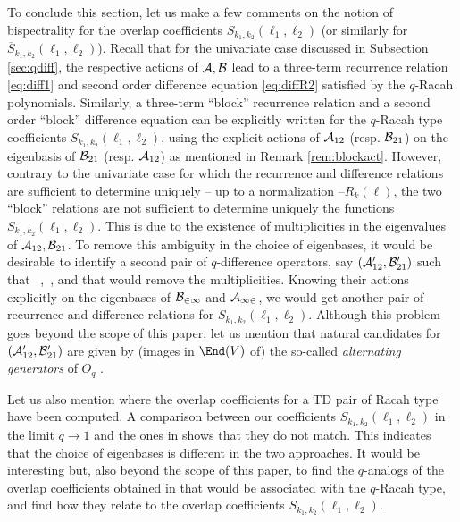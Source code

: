 \documentclass[11pt]{amsart}
\numberwithin{equation}{section}
\numberwithin{equation}{section}
\begin{document}
To conclude this section, let us make a few comments on the
notion of bispectrality for the overlap coefficients ${S}_{k_1,k_2}(\ell_1,\ell_2)$ (or similarly for $\overline{S}_{k_1,k_2}(\ell_1,\ell_2)$).
Recall that for the univariate case discussed in Subsection \ref{sec:qdiff}, the respective actions of ${\cal A},{\cal B}$ lead to a three-term recurrence relation \eqref{eq:diff1} and second order difference equation \eqref{eq:diffR2} satisfied by the $q$-Racah polynomials.
Similarly, a three-term ``block'' recurrence  relation and a second order ``block'' difference equation can be explicitly written 
for the $q$-Racah type coefficients  ${S}_{k_1,k_2}(\ell_1,\ell_2)$, using the explicit actions of ${\cal A}_{12}$ (resp. ${\cal B}_{21}$) on the eigenbasis of ${\cal B}_{21}$ (resp. ${\cal A}_{12}$) as mentioned in Remark \ref{rem:blockact}. However, contrary to the univariate case for which the recurrence and difference relations are sufficient to determine uniquely -- up to a normalization --$R_k(\ell)$, the two ``block'' relations are not sufficient to determine uniquely the functions ${S}_{k_1,k_2}(\ell_1,\ell_2)$. This is due to the existence of multiplicities in the eigenvalues of ${\cal A}_{12},{\cal B}_{21}$. To remove this ambiguity in the choice of eigenbases, it would be desirable to identify a second pair of $q$-difference operators, say $({\cal A}'_{12},{\cal B}'_{21})$
such that 
 \ ,\ ,
\eeqa
and that would remove the multiplicities.  Knowing their actions explicitly on the eigenbases of $\cal B_{21}$ and $\cal A_{12}$, 
we would get another pair of recurrence and difference relations for  ${S}_{k_1,k_2}(\ell_1,\ell_2)$. Although this problem goes beyond the scope of this paper, let us mention that
natural candidates for $({\cal A}'_{12},{\cal B}'_{21})$ are given by (images in $\End(V)$ of) the so-called {\it alternating generators} of $O_q$ \cite{BasBel,Ter21b}.  
   
Let us also mention \cite{CGT25} where the overlap coefficients for a TD pair of Racah type have been computed. A comparison between our coefficients ${S}_{k_1,k_2}(\ell_1,\ell_2)$ in the limit $q\rightarrow 1$ and the ones in \cite[Thm.\,5.1]{CGT25} shows that they do not match.   This indicates that the choice of eigenbases is different in the two approaches. It would be interesting but, also beyond the scope of this paper, to find the $q$-analogs of the overlap coefficients obtained in \cite{CGT25} that would be associated with the $q$-Racah type,  and find how they relate to the overlap coefficients ${S}_{k_1,k_2}(\ell_1,\ell_2)$.
\end{document}
